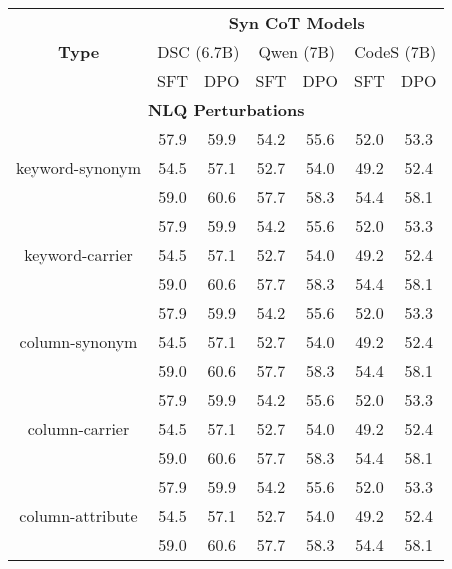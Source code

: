 \iffalse
{}
\begin{table*}[t!]
    \centering
\begin{adjustbox}{max width=\textwidth}
    \begin{tabular}{c | c c | c c | c c }
        \toprule
         \multirow{3}{*}{\textbf{Type}} & \multicolumn{6}{c}{\textbf{Syn CoT Models}} \\ \cline{2-7}
         & \multicolumn{2}{c}{DSC (6.7B)} & \multicolumn{2}{c}{Qwen (7B)} & \multicolumn{2}{c}{CodeS (7B)} \\ \cline{2-7}
         & SFT & DPO & SFT & DPO & SFT & DPO \\ \midrule
        \multicolumn{7}{c}{\textbf{NLQ Perturbations}} \\ \midrule

        \multirow{3}{*}{keyword-synonym} & 57.9	& 59.9	& 54.2	&55.6	&52.0	&53.3 \\     
        &54.5	&57.1	&52.7	&54.0	&49.2	&52.4 \\
        &59.0	&60.6	&57.7	&58.3	&54.4	&58.1 \\ \midrule

        \multirow{3}{*}{keyword-carrier} & 57.9	& 59.9	& 54.2	&55.6	&52.0	&53.3 \\     
        &54.5	&57.1	&52.7	&54.0	&49.2	&52.4 \\
        &59.0	&60.6	&57.7	&58.3	&54.4	&58.1 \\ \midrule

        \multirow{3}{*}{column-synonym} & 57.9	& 59.9	& 54.2	&55.6	&52.0	&53.3 \\     
        &54.5	&57.1	&52.7	&54.0	&49.2	&52.4 \\
        &59.0	&60.6	&57.7	&58.3	&54.4	&58.1 \\ \midrule

        \multirow{3}{*}{column-carrier} & 57.9	& 59.9	& 54.2	&55.6	&52.0	&53.3 \\     
        &54.5	&57.1	&52.7	&54.0	&49.2	&52.4 \\
        &59.0	&60.6	&57.7	&58.3	&54.4	&58.1 \\ \midrule

        \multirow{3}{*}{column-attribute} & 57.9	& 59.9	& 54.2	&55.6	&52.0	&53.3 \\     
        &54.5	&57.1	&52.7	&54.0	&49.2	&52.4 \\
        &59.0	&60.6	&57.7	&58.3	&54.4	&58.1 \\ \midrule 


\end{tabular}
\end{adjustbox}
\end{table*}
